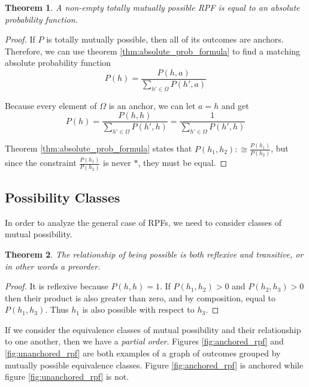 \documentclass[twoside]{article}
\theoremstyle{plain}%
\newtheorem{theorem}{Theorem}[section]
\theoremstyle{definition}
\theoremstyle{remark}
\begin{document}
\begin{theorem}
A non-empty totally mutually possible RPF is equal to an absolute probability function.
\end{theorem}

\begin{proof}
If \(P\) is totally mutually possible, then all of its outcomes are anchors. Therefore, we can use theorem \ref{thm:absolute_prob_formula} to find a matching absolute probability function
\[P(h) = \frac{P(h, a)}{\sum_{h' \in \Omega}P(h', a)}\]

Because every element of \(\Omega\) is an anchor, we can let \(a = h\) and get
\[P(h) = \frac{P(h, h)}{\sum_{h' \in \Omega}P(h', h)}=\frac{1}{\sum_{h' \in \Omega}P(h', h)}\]

Theorem \ref{thm:absolute_prob_formula} states that \(P(h_1, h_2) :\cong \frac{P(h_1)}{P(h_2)}\), but since the constraint \(\frac{P(h_1)}{P(h_2)}\) is never \(\ast\), they must be equal.
\end{proof}

\subsection{Possibility Classes}
\label{section:possibility_classes}

In order to analyze the general case of RPFs, we need to consider classes of mutual possibility.

\begin{theorem}
The relationship of being possible is both reflexive and transitive, or in other words a \textit{preorder}.
\end{theorem}

\begin{proof}
It is reflexive because \(P(h, h) = 1\). If \(P(h_1, h_2) > 0\) and \(P(h_2, h_3) > 0\) then their product is also greater than zero, and by composition, equal to \(P(h_1, h_3)\). Thus \(h_1\) is also possible with respect to \(h_3\).
\end{proof}

If we consider the equivalence classes of mutual possibility and their relationship to one another, then we have a \textit{partial order}. Figures \ref{fig:anchored_rpf} and \ref{fig:unanchored_rpf} are both examples of a graph of outcomes grouped by mutually possible equivalence classes. Figure \ref{fig:anchored_rpf} is anchored while figure \ref{fig:unanchored_rpf} is not.
\end{document}

